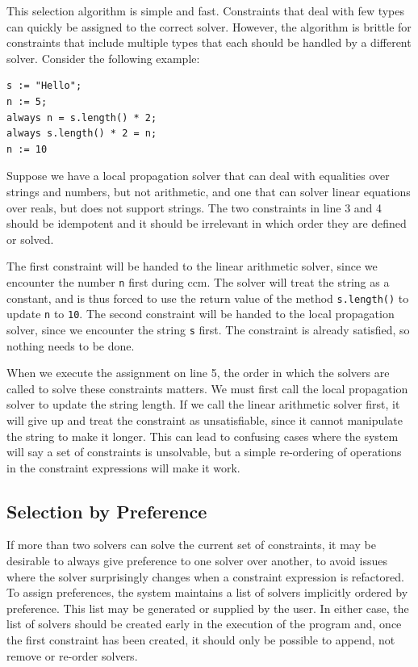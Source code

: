This selection algorithm is simple and fast. Constraints that deal
with few types can quickly be assigned to the correct solver. However,
the algorithm is brittle for constraints that include multiple types
that each should be handled by a different solver. Consider the
following example:
\begin{lstlisting}
s := "Hello";
n := 5;
always n = s.length() * 2;
always s.length() * 2 = n;
n := 10
\end{lstlisting}
Suppose we have a local propagation solver that can deal with
equalities over strings and numbers, but not arithmetic, and one that
can solver linear equations over reals, but does not support
strings. The two constraints in line 3 and 4 should be idempotent and
it should be irrelevant in which order they are defined or solved.

The first constraint will be handed to the linear arithmetic solver,
since we encounter the number \verb!n! first during \gls{ccm}. The
solver will treat the string as a constant, and is thus forced to use
the return value of the method \verb!s.length()! to update \verb!n! to
\verb!10!. The second constraint will be handed to the local
propagation solver, since we encounter the string \verb!s! first. The
constraint is already satisfied, so nothing needs to be done.

When we execute the assignment on line 5, the order in which the
solvers are called to solve these constraints matters. We must first
call the local propagation solver to update the string length. If we
call the linear arithmetic solver first, it will give up and treat the
constraint as unsatisfiable, since it cannot manipulate the string to
make it longer. This can lead to confusing cases where the system will
say a set of constraints is unsolvable, but a simple re-ordering of
operations in the constraint expressions will make it work.

\subsection{Selection by Preference}
If more than two solvers can solve the current set of constraints, it may be
desirable to always give preference to one solver over another, to avoid issues
where the solver surprisingly changes when a constraint expression is
refactored. To assign preferences, the system maintains a list of solvers
implicitly ordered by preference. This list may be generated or supplied by the
user. In either case, the list of solvers should be created early in the
execution of the program and, once the first constraint has been created, it
should only be possible to append, not remove or re-order solvers.

